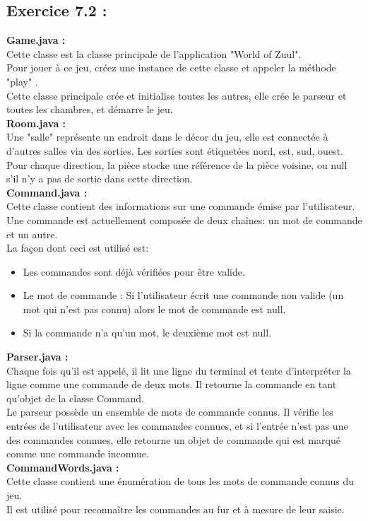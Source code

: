 \documentclass[french,10pt,a4paper]{report}
\begin{document}
\subsection{\textcolor{bb}{Exercice 7.2 :}}
\textbf{Game.java :}\\
Cette classe est la classe principale de l'application "World of Zuul".\\
Pour jouer à ce jeu, créez une instance de cette classe et appeler la méthode "play" .\\
Cette classe principale crée et initialise toutes les autres, elle crée le parseur et toutes les chambres, et démarre le jeu.\\
\textbf{Room.java :}\\
Une "salle" représente un endroit dans le décor du jeu, elle est connectée à d'autres salles via des sorties. Les sorties sont étiquetées nord, est, sud, ouest. Pour chaque direction, la pièce stocke une référence de la pièce voisine, ou null s'il n'y a pas de sortie dans cette direction.\\
\textbf{Command.java :}\\
Cette classe contient des informations sur une commande émise par l'utilisateur.
Une commande est actuellement composée de deux chaînes: un mot de commande et un autre. \\
La façon dont ceci est utilisé est:
\begin{itemize}
\item Les commandes sont déjà vérifiées pour être valide.
\item Le mot de commande :  Si l'utilisateur écrit une commande non valide (un mot 	qui n'est pas connu) alors le mot de commande est  null.
\item Si la commande n'a qu'un mot, le deuxième mot est  null.
\end{itemize}
\textbf{Parser.java :}\\
Chaque fois qu'il est appelé, il lit une ligne du terminal et
tente d'interpréter la ligne comme une commande de deux mots. Il retourne la commande en tant qu'objet de la classe Command.\\
Le parseur possède un ensemble de mots de commande connus. Il vérifie les entrées de l'utilisateur avec les commandes connues, et si l'entrée n'est pas une des commandes connues, elle retourne un objet de commande qui est marqué comme une commande inconnue.\\
\textbf{CommandWords.java :}\\
Cette classe contient une énumération de tous les mots de commande connus du jeu.\\
Il est utilisé pour reconnaître les commandes au fur et à mesure de leur saisie.
\end{document}
